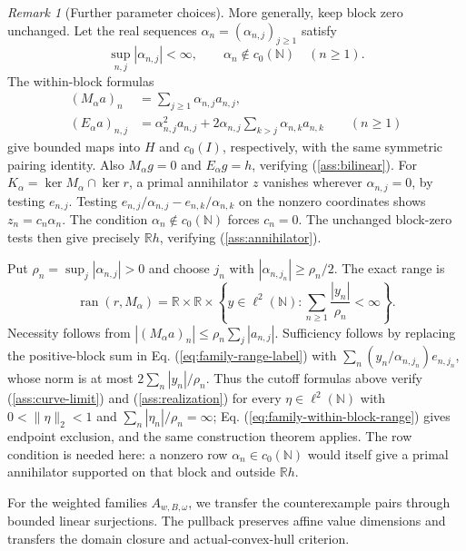 \documentclass[11pt]{article}
\newcommand{\R}{\mathbb R}
\newcommand{\N}{\mathbb N}
\theoremstyle{definition}
\theoremstyle{remark}
\newtheorem{remark}{Remark}
\begin{document}
\begin{remark}[Further parameter choices]
More generally, keep block zero unchanged. Let the real sequences $\alpha_n=(\alpha_{n,j})_{j\ge1}$ satisfy
\[
\sup_{n,j}|\alpha_{n,j}|<\infty,
\qquad \alpha_n\notin c_0(\N)\quad(n\ge1).
\]
The within-block formulas
\begin{equation}
\begin{aligned}
(M_\alpha a)_n&=\sum_{j\ge1}\alpha_{n,j}a_{n,j},\\
(E_\alpha a)_{n,j}&=\alpha_{n,j}^2a_{n,j}
 +2\alpha_{n,j}\sum_{k>j}\alpha_{n,k}a_{n,k}
\qquad(n\ge1)
\end{aligned}
\label{eq:family-within-block}
\end{equation}
give bounded maps into $H$ and $c_0(I)$, respectively, with the same symmetric pairing identity. Also $M_\alpha g=0$ and $E_\alpha g=h$, verifying \textup{(\ref{ass:bilinear})}. For $K_\alpha=\ker M_\alpha\cap\ker r$, a primal annihilator $z$ vanishes wherever $\alpha_{n,j}=0$, by testing $e_{n,j}$. Testing $e_{n,j}/\alpha_{n,j}-e_{n,k}/\alpha_{n,k}$ on the nonzero coordinates shows $z_n=c_n\alpha_n$. The condition $\alpha_n\notin c_0(\N)$ forces $c_n=0$. The unchanged block-zero tests then give precisely $\R h$, verifying \textup{(\ref{ass:annihilator})}.

Put $\rho_n=\sup_j|\alpha_{n,j}|>0$ and choose $j_n$ with $|\alpha_{n,j_n}|\ge\rho_n/2$. The exact range is
\begin{equation}
\operatorname{ran}(r,M_\alpha)
=\R\times\R\times
\left\{y\in\ell^2(\N):\sum_{n\ge1}\frac{|y_n|}{\rho_n}<\infty\right\}.
\label{eq:family-within-block-range}
\end{equation}
Necessity follows from $|(M_\alpha a)_n|\le\rho_n\sum_j|a_{n,j}|$. Sufficiency follows by replacing the positive-block sum in Eq. (\ref{eq:family-range-label}) with $\sum_n(y_n/\alpha_{n,j_n})e_{n,j_n}$, whose norm is at most $2\sum_n|y_n|/\rho_n$. Thus the cutoff formulas above verify \textup{(\ref{ass:curve-limit})} and \textup{(\ref{ass:realization})} for every $\eta\in\ell^2(\N)$ with $0<\|\eta\|_2<1$ and $\sum_n|\eta_n|/\rho_n=\infty$; Eq. (\ref{eq:family-within-block-range}) gives endpoint exclusion, and the same construction theorem applies. The row condition is needed here: a nonzero row $\alpha_n\in c_0(\N)$ would itself give a primal annihilator supported on that block and outside $\R h$.
\end{remark}

For the weighted families $A_{w,B,\omega}$, we transfer the counterexample pairs through bounded linear surjections. The pullback preserves affine value dimensions and transfers the domain closure and actual-convex-hull criterion.
\end{document}
